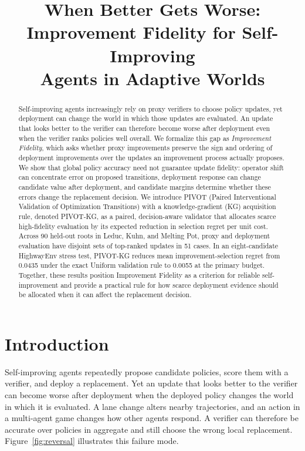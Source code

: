 \documentclass{article}
\title{When Better Gets Worse:\\
Improvement Fidelity for Self-Improving\\
Agents in Adaptive Worlds}
\author{}
\date{}
\begin{document}
\maketitle

\begin{abstract}
Self-improving agents increasingly rely on proxy verifiers to choose policy
updates, yet deployment can change the world in which those updates are
evaluated. An update that looks better to the verifier can therefore become
worse after deployment even when the verifier ranks policies well overall. We
formalize this gap as \emph{Improvement Fidelity}, which asks whether proxy
improvements preserve the sign and ordering of deployment improvements over
the updates an improvement process actually proposes. We show that global
policy accuracy need not guarantee update fidelity: operator shift can
concentrate error on proposed transitions, deployment response can change
candidate value after deployment, and candidate margins determine whether these errors
change the replacement decision. We introduce PIVOT (Paired Interventional Validation of Optimization Transitions) with a knowledge-gradient (KG) acquisition rule, denoted PIVOT-KG, as a paired,
decision-aware validator that allocates scarce high-fidelity evaluation by its
expected reduction in selection regret per unit cost. Across 90 held-out roots
in Leduc, Kuhn, and Melting Pot, proxy and deployment evaluation have
disjoint sets of top-ranked updates in 51 cases. In an eight-candidate HighwayEnv stress
test, PIVOT-KG reduces mean improvement-selection regret from 0.0435 under the
exact Uniform validation rule to 0.0055 at the primary budget. Together, these
results position Improvement Fidelity as a criterion for reliable
self-improvement and provide a practical rule for how scarce deployment evidence
should be allocated when it can affect the replacement decision.
\end{abstract}


\section{Introduction}

Self-improving agents repeatedly propose candidate policies, score them with a
verifier, and deploy a replacement. Yet an update that looks better to the
verifier can become worse after deployment when the deployed policy changes the
world in which it is evaluated. A lane change alters nearby trajectories, and
an action in a multi-agent game changes how other agents respond. A verifier
can therefore be accurate over policies in aggregate and still choose the wrong
local replacement. Figure~\ref{fig:reversal} illustrates this failure mode.
\end{document}
